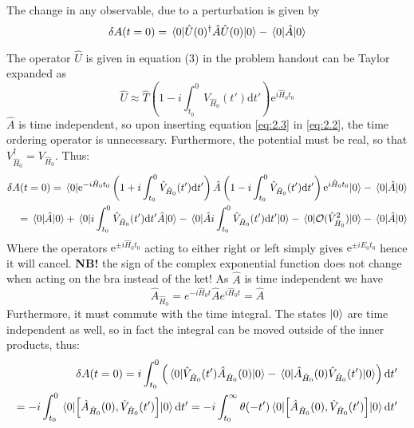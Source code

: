 \begin{solution}
The change in any observable, due to a perturbation is given by
\begin{equation}
    \delta A(t=0) = \mel{0}{\hat{U}(0)^{\dagger} \hat{A} \hat{U}(0)}{0} - \mel{0}{\hat{A}}{0}
    \label{eq:2.2}
\end{equation}

The operator $\hat{U}$ is given in equation (3) in the problem handout can be Taylor expanded as
\begin{equation}
    \hat{U} \approx \hat{T}(1-i \int_{t_0}^0 \hat{V}_{\hat{H}_0}(t') \text{d}t')\mathrm{e}^{i\hat{H}_0t_0}
    \label{eq:2.3}
\end{equation}
$\hat{A}$ is time independent, so upon inserting equation \ref{eq:2.3} in \ref{eq:2.2}, the time ordering operator is unnecessary. Furthermore, the potential must be real, so that  $V_{\hat{H}_0}^{\dagger} = V_{\hat{H}_0}$. Thus:
{\small \begin{equation}
\begin{split}
        \delta A(t=0) = \mel{0}{\mathrm{e}^{-i\hat{H}_0t_0}\left( 1+i \int_{t_0}^0 \hat{V}_{\hat{H}_0}(t') \text{d}t' \right) \hat{A} \left( 1-i \int_{t_0}^0 \hat{V}_{\hat{H}_0}(t') \text{d}t'\right)\mathrm{e}^{i\hat{H}_0t_0}}{0} - \mel{0}{\hat{A}}{0} \\
        = \mel{0}{\hat{A}}{0} + \mel{0}{i \int_{t_0}^0 \hat{V}_{\hat{H}_0}(t') \text{d}t' \hat{A}}{0} - \mel{0}{\hat{A} i \int_{t_0}^0 \hat{V}_{\hat{H}_0}(t') \text{d}t'}{0} - \mel{0}{\mathcal{O}(\hat{V}_{\hat{H}_0}^2)}{0} - \mel{0}{\hat{A}}{0}
\end{split}
\end{equation}}
Where the operators $\mathrm{e}^{\pm i \hat{H}_0t_0}$ acting to either right or left simply gives $\mathrm{e}^{\pm i E_0 t_0}$ hence it will cancel. \textbf{NB!} the sign of the complex exponential function does not change when acting on the bra instead of the ket!
As $\hat{A}$ is time independent we have
\begin{equation}
    \hat{A}_{\hat{H}_0} = e^{-i\hat{H}_0t} \hat{A} e^{i \hat{H}_0 t} = \hat{A}
\end{equation}
Furthermore, it must commute with the time integral. The states $|0\rangle$ are time independent as well, so in fact the integral can be moved outside of the inner products, thus:
\begin{equation}
\begin{split}
        \delta A(t=0) = i\int_{t_0}^0 \left(\mel{0}{\hat{V}_{\hat{H}_0}(t') \hat{A}_{\hat{H}_0}(0)}{0} - \mel{0}{\hat{A}_{\hat{H}_0}(0) \hat{V}_{\hat{H}_0}(t')}{0}\right) \text{d}t' \\ = - i \int_{t_0}^0 \mel{0}{\comm{\hat{A}_{\hat{H}_0}(0)}{ \hat{V}_{\hat{H}_0}(t')}}{0} \text{d}t' = - i \int_{t_0}^{\infty} \theta(-t') \mel{0}{\comm{\hat{A}_{\hat{H}_0}(0)}{ \hat{V}_{\hat{H}_0}(t')}}{0} \text{d}t'

\end{split}
\end{equation}
\end{solution}
